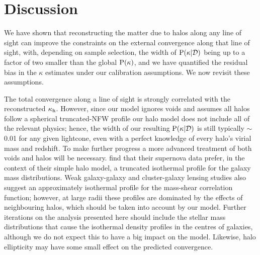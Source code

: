 \documentclass[useAMS,usenatbib]{mn2e}
\begin{document}


\section{Discussion}
\label{sec:discuss}

We have shown that reconstructing the matter due to halos along any line of
sight can improve the constraints on the external convergence along that line
of sight, with, depending on sample selection,  the width of
${\rm P}(\kappa|{\mathcal{D}})$ being up to a factor of two smaller than the global
${\rm P}(\kappa)$, and  we have quantified the residual bias in the $\kappa$
estimates under our calibration assumptions. We now revisit these assumptions.

The total convergence along a line of sight is strongly correlated with the
reconstructed $\kappa_{\rm h}$. However, since our model ignores voids and assumes
all halos follow a spherical truncated-NFW profile our halo model does not
include all of the relevant physics; hence, the width of our resulting
${\rm P}(\kappa|{\mathcal{D}})$ is still typically $\sim$0.01 for any given lightcone,
even with a perfect knowledge of every halo's virial mass and redshift. To
make further progress a more advanced treatment of both voids and halos will
be necessary. \citet{KarpenkaEtal2012} find that their supernova data prefer,
in the context of their simple halo model, a truncated isothermal profile for
the galaxy mass distributions. Weak galaxy-galaxy and cluster-galaxy  lensing
studies \citep[\eg][]{GavazziEtal2006,JohnstonEtal2007} also suggest an
approximately isothermal profile for the mass-shear correlation function;
however, at large radii these profiles are dominated by the effects of
neighbouring halos, which should be taken into account by our model. Further
iterations on the analysis presented here should include the stellar mass
distributions that cause the isothermal density profiles in the centres of
galaxies, although we do not expect this to have a big impact on the model.
Likewise,  halo ellipticity may have some small effect on the predicted
convergence. 
\end{document}
